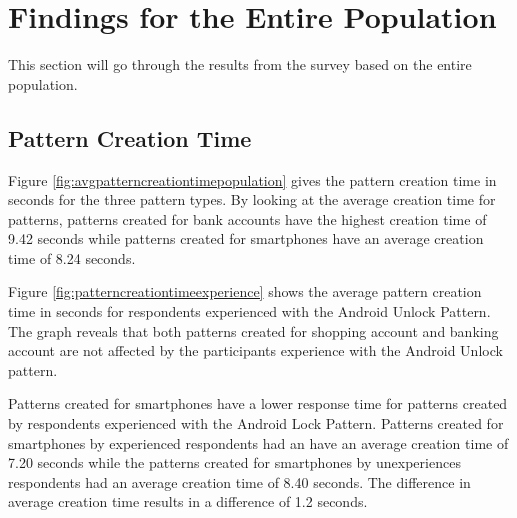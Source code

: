 \section{Findings for the Entire Population}
  
  This section will go through the results from the survey based on the entire population. 

	\subsection{Pattern Creation Time}
    Figure \ref{fig:avgpatterncreationtimepopulation} gives the pattern creation time in seconds for the three pattern types. By looking at the average creation time for patterns, patterns created for bank accounts have the highest creation time of 9.42 seconds while patterns created for smartphones have an average creation time of 8.24 seconds. 

    Figure \ref{fig:patterncreationtimeexperience} shows the average pattern creation time in seconds for respondents experienced with the Android Unlock Pattern. The graph reveals that both patterns created for shopping account and banking account are not affected by the participants experience with the Android Unlock pattern.

    Patterns created for smartphones have a lower response time for patterns created by respondents experienced with the Android Lock Pattern. Patterns created for smartphones by experienced respondents had an have an average creation time of 7.20 seconds while the patterns created for smartphones by unexperiences respondents had an average creation time of 8.40 seconds. The difference in average creation time results in a difference of 1.2 seconds. 

